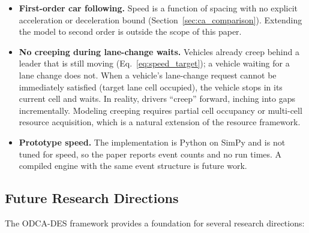 \documentclass[review,number]{elsarticle}
\begin{document}
\begin{itemize}
    \item \textbf{First-order car following.} Speed is a function of spacing with no explicit acceleration or deceleration bound (Section~\ref{sec:ca_comparison}). Extending the model to second order is outside the scope of this paper.

    \item \textbf{No creeping during lane-change waits.} Vehicles already creep behind a leader that is still moving (Eq.~\eqref{eq:speed_target}); a vehicle waiting for a lane change does not. When a vehicle's lane-change request cannot be immediately satisfied (target lane cell occupied), the vehicle stops in its current cell and waits. In reality, drivers ``creep'' forward, inching into gaps incrementally. Modeling creeping requires partial cell occupancy or multi-cell resource acquisition, which is a natural extension of the resource framework.
    \item \textbf{Prototype speed.} The implementation is Python on SimPy and is not tuned for speed, so the paper reports event counts and no run times. A compiled engine with the same event structure is future work.
\end{itemize}

\subsection{Future Research Directions}
\label{sec:future}

The ODCA-DES framework provides a foundation for several research directions:
\end{document}
